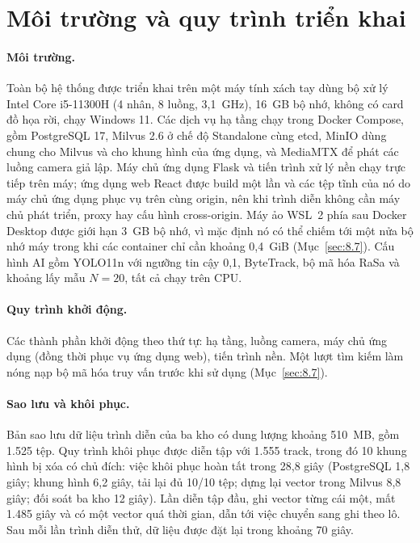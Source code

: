 \section{Môi trường và quy trình triển khai}
\label{sec:7.1}
\label{sec:7.3}

\paragraph{Môi trường.} Toàn bộ hệ thống được triển khai trên một máy tính xách tay dùng bộ xử lý Intel Core i5-11300H (4 nhân, 8 luồng, 3,1~GHz), 16~GB bộ nhớ, không có card đồ họa rời, chạy Windows 11. Các dịch vụ hạ tầng chạy trong Docker Compose, gồm PostgreSQL 17, Milvus 2.6 ở chế độ Standalone cùng etcd, MinIO dùng chung cho Milvus và cho khung hình của ứng dụng, và MediaMTX để phát các luồng camera giả lập. Máy chủ ứng dụng Flask và tiến trình xử lý nền chạy trực tiếp trên máy; ứng dụng web React được build một lần và các tệp tĩnh của nó do máy chủ ứng dụng phục vụ trên cùng origin, nên khi trình diễn không cần máy chủ phát triển, proxy hay cấu hình cross-origin. Máy ảo WSL~2 phía sau Docker Desktop được giới hạn 3~GB bộ nhớ, vì mặc định nó có thể chiếm tới một nửa bộ nhớ máy trong khi các container chỉ cần khoảng 0,4~GiB (Mục~\ref{sec:8.7}). Cấu hình AI gồm YOLO11n với ngưỡng tin cậy 0,1, ByteTrack, bộ mã hóa RaSa và khoảng lấy mẫu $N = 20$, tất cả chạy trên CPU.

\paragraph{Quy trình khởi động.} Các thành phần khởi động theo thứ tự: hạ tầng, luồng camera, máy chủ ứng dụng (đồng thời phục vụ ứng dụng web), tiến trình nền. Một lượt tìm kiếm làm nóng nạp bộ mã hóa truy vấn trước khi sử dụng (Mục~\ref{sec:8.7}).

\paragraph{Sao lưu và khôi phục.} Bản sao lưu dữ liệu trình diễn của ba kho có dung lượng khoảng 510~MB, gồm 1.525 tệp. Quy trình khôi phục được diễn tập với 1.555 track, trong đó 10 khung hình bị xóa có chủ đích: việc khôi phục hoàn tất trong 28,8 giây (PostgreSQL 1,8 giây; khung hình 6,2 giây, tải lại đủ 10/10 tệp; dựng lại vector trong Milvus 8,8 giây; đối soát ba kho 12 giây). Lần diễn tập đầu, ghi vector từng cái một, mất 1.485 giây và có một vector quá thời gian, dẫn tới việc chuyển sang ghi theo lô. Sau mỗi lần trình diễn thử, dữ liệu được đặt lại trong khoảng 70 giây.
